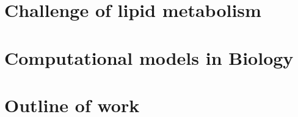 \section{Challenge of lipid metabolism}



\section{Computational models in Biology}


\section{Outline of work}
